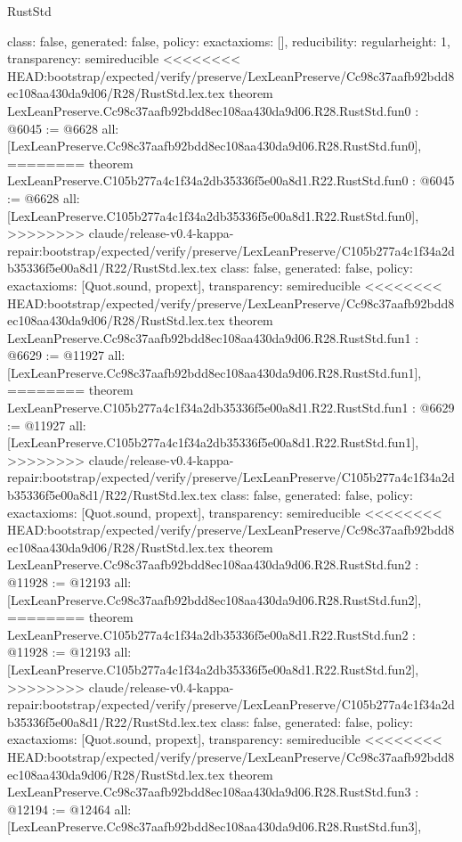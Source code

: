\begin{lexlean}{RustStd}
\begin{coremodule}
{\begin{coremodule}
{{{  class: false,
  generated: false,
  policy: exact{axioms: []},
  reducibility: regular{height: 1},
  transparency: semireducible
}
<<<<<<<< HEAD:bootstrap/expected/verify/preserve/LexLeanPreserve/Cc98c37aafb92bdd8ec108aa430da9d06/R28/RustStd.lex.tex
theorem LexLeanPreserve.Cc98c37aafb92bdd8ec108aa430da9d06.R28.RustStd.fun0 : @6045 := @6628 {
  all: [LexLeanPreserve.Cc98c37aafb92bdd8ec108aa430da9d06.R28.RustStd.fun0],
========
theorem LexLeanPreserve.C105b277a4c1f34a2db35336f5e00a8d1.R22.RustStd.fun0 : @6045 := @6628 {
  all: [LexLeanPreserve.C105b277a4c1f34a2db35336f5e00a8d1.R22.RustStd.fun0],
>>>>>>>> claude/release-v0.4-kappa-repair:bootstrap/expected/verify/preserve/LexLeanPreserve/C105b277a4c1f34a2db35336f5e00a8d1/R22/RustStd.lex.tex
  class: false,
  generated: false,
  policy: exact{axioms: [Quot.sound, propext]},
  transparency: semireducible
}
<<<<<<<< HEAD:bootstrap/expected/verify/preserve/LexLeanPreserve/Cc98c37aafb92bdd8ec108aa430da9d06/R28/RustStd.lex.tex
theorem LexLeanPreserve.Cc98c37aafb92bdd8ec108aa430da9d06.R28.RustStd.fun1 : @6629 := @11927 {
  all: [LexLeanPreserve.Cc98c37aafb92bdd8ec108aa430da9d06.R28.RustStd.fun1],
========
theorem LexLeanPreserve.C105b277a4c1f34a2db35336f5e00a8d1.R22.RustStd.fun1 : @6629 := @11927 {
  all: [LexLeanPreserve.C105b277a4c1f34a2db35336f5e00a8d1.R22.RustStd.fun1],
>>>>>>>> claude/release-v0.4-kappa-repair:bootstrap/expected/verify/preserve/LexLeanPreserve/C105b277a4c1f34a2db35336f5e00a8d1/R22/RustStd.lex.tex
  class: false,
  generated: false,
  policy: exact{axioms: [Quot.sound, propext]},
  transparency: semireducible
}
<<<<<<<< HEAD:bootstrap/expected/verify/preserve/LexLeanPreserve/Cc98c37aafb92bdd8ec108aa430da9d06/R28/RustStd.lex.tex
theorem LexLeanPreserve.Cc98c37aafb92bdd8ec108aa430da9d06.R28.RustStd.fun2 : @11928 := @12193 {
  all: [LexLeanPreserve.Cc98c37aafb92bdd8ec108aa430da9d06.R28.RustStd.fun2],
========
theorem LexLeanPreserve.C105b277a4c1f34a2db35336f5e00a8d1.R22.RustStd.fun2 : @11928 := @12193 {
  all: [LexLeanPreserve.C105b277a4c1f34a2db35336f5e00a8d1.R22.RustStd.fun2],
>>>>>>>> claude/release-v0.4-kappa-repair:bootstrap/expected/verify/preserve/LexLeanPreserve/C105b277a4c1f34a2db35336f5e00a8d1/R22/RustStd.lex.tex
  class: false,
  generated: false,
  policy: exact{axioms: [Quot.sound, propext]},
  transparency: semireducible
}
<<<<<<<< HEAD:bootstrap/expected/verify/preserve/LexLeanPreserve/Cc98c37aafb92bdd8ec108aa430da9d06/R28/RustStd.lex.tex
theorem LexLeanPreserve.Cc98c37aafb92bdd8ec108aa430da9d06.R28.RustStd.fun3 : @12194 := @12464 {
  all: [LexLeanPreserve.Cc98c37aafb92bdd8ec108aa430da9d06.R28.RustStd.fun3],
}}}}}}
\end{coremodule}}
\end{coremodule}
\end{lexlean}
